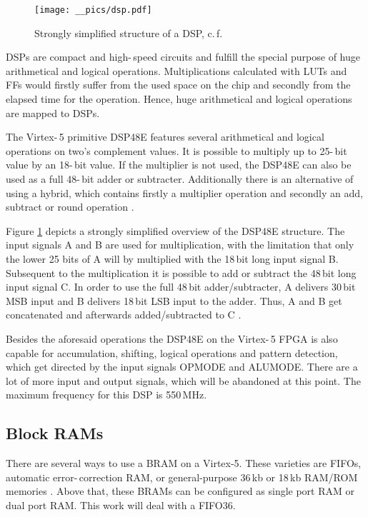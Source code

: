 	\begin{figure}[h]
		\center
		\texttt{[image: \_\_pics/dsp.pdf]}
		\caption{Strongly simplified structure of a DSP, c.\,f. \cite{Xilinx2010c}}
		\label{pic:dsp}	
	\end{figure} 

\acp{DSP} are compact and high-\,speed circuits and fulfill the special purpose of huge arithmetical and logical operations. Multiplications calculated with \acp{LUT} and \acp{FF} would firstly suffer from the used space on the chip and secondly from the elapsed time for the operation. Hence, huge arithmetical and logical operations are mapped to \acp{DSP}.

The Virtex-\,5 primitive \ac{DSP48E}  features several arithmetical and logical operations on two's complement values. It is possible to multiply up to 25-\,bit value by an 18-\,bit value. If the multiplier is not used, the \ac{DSP48E} can also be used as a full 48-\,bit adder or subtracter. Additionally there is an alternative of using a hybrid, which contains firstly a multiplier operation and secondly an add, subtract or round operation \cite{Xilinx2012b}. 

Figure \ref{pic:dsp} depicts a strongly simplified overview of the \ac{DSP48E} structure. The input signals A and B are used for multiplication, with the limitation that only the lower 25 bits of A will by multiplied with the 18\,bit long input signal B. Subsequent to the multiplication it is possible to add or subtract the 48\,bit long input signal C. In order to use the full 48\,bit adder/subtracter, A delivers 30\,bit \ac{MSB} input and B delivers 18\,bit \ac{LSB} input to the adder. Thus, A and B get concatenated and afterwards added/subtracted to C \cite{Xilinx2010c}.

Besides the aforesaid operations the \ac{DSP48E} on the Virtex-\,5 \ac{FPGA} is also capable for accumulation, shifting, logical operations and pattern detection, which get directed by the input signals OPMODE and ALUMODE. There are a lot of more input and output signals, which will be abandoned at this point. The maximum frequency for this \ac{DSP} is 550\,MHz.

\subsection{Block RAMs}

There are several ways to use a \ac{BRAM} on a Virtex-5. These varieties are \acp{FIFO}, automatic error-\,correction \ac{RAM}, or general-purpose 36\,kb or 18\,kb \ac{RAM}/\ac{ROM} memories \cite{Xilinx2010c}. Above that, these \acp{BRAM} can be configured as single port \ac{RAM} or dual port \ac{RAM}. This work will deal with a \ac{FIFO36}.

